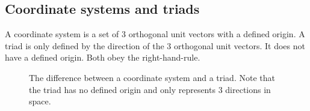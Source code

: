 \documentclass[11pt, a4paper]{article}
\begin{document}
\subsection{Coordinate systems and triads}
A coordinate system is a set of 3 orthogonal unit vectors with a defined origin. A triad is only defined by the direction of the 3 orthogonal unit vectors. It does not have a defined origin. Both obey the right-hand-rule.
\begin{figure}[h]
  \centering
  \qquad
  \caption{The difference between a coordinate system and a triad. Note that the triad has no defined origin and only represents 3 directions in space.}
\end{figure}
\end{document}

